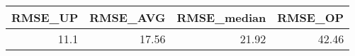 \begin{tabular}{rrrr}
\toprule
 RMSE\_UP &  RMSE\_AVG &  RMSE\_median &  RMSE\_OP \\
\midrule
    11.1 &     17.56 &        21.92 &    42.46 \\
\bottomrule
\end{tabular}

